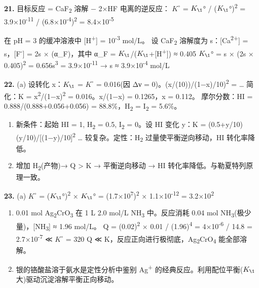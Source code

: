 \textbf{21.} 目标反应 = CaF\textsubscript{2} 溶解 − 2×HF 电离的逆反应：
\(K^{\circ}\) = \(K_{\1}\)° / (\(K_{\1}\)°)\textsuperscript{2} = 3.9×10\textsuperscript{-11} / (6.8×10\textsuperscript{-4})\textsuperscript{2} = 8.4×10\textsuperscript{-5}

在 pH = 3 的缓冲溶液中 {[}H\textsuperscript{+}{]} = 10\textsuperscript{-3} mol/L。
设 CaF\textsubscript{2} 溶解度为 s：{[}Ca\textsuperscript{2+}{]} = s，{[}F\textsuperscript{-}{]} = 2s × (α\_F)，其中 α\_F = \(K_{\1}\)/(\(K_{\1}\)+{[}H\textsuperscript{+}{]}) ≈ 0.405
\(K_{\1}\)° = s × (2s × 0.405)\textsuperscript{2} = 0.656s\textsuperscript{3} = 3.9×10\textsuperscript{-11} → s ≈ 3.9×10\textsuperscript{-4} mol/L

\textbf{22.}
(a) 设转化 x：\(K_{\1}\) = \(K^{\circ}\) = 0.016(因 Δν = 0)。(x/(10))/(1−x)/10)\textsuperscript{2} = \ldots{} 简化：K = x\textsuperscript{2}/(1−x)\textsuperscript{2} = 0.016。x/(1−x) = 0.1265，x = 0.112。
摩尔分数：HI = 0.888/(0.888+0.056+0.056) = 88.8\%，H\textsubscript{2} = I\textsubscript{2} = 5.6\%。

\begin{enumerate}
\def\labelenumi{(\alph{enumi})}
\setcounter{enumi}{1}
\item
  新条件：起始 HI = 1, H\textsubscript{2} = 0.5, I\textsubscript{2} = 0。设 HI 变化 y：K = (0.5+y/10)(y/10)/{[}(1−y)/10{]}\textsuperscript{2} \ldots{} 较复杂。定性：H\textsubscript{2} 过量使平衡逆向移动，HI 转化率降低。
\item
  增加 H\textsubscript{2}(产物)→ Q \textgreater{} K → 平衡逆向移动 → HI 转化率降低。与勒夏特列原理一致。
\end{enumerate}

\textbf{23.}
(a) \(K^{\circ}\) = (\(K_{\1}\)°)\textsuperscript{2} × \(K_{\1}\)° = (1.7×10\textsuperscript{7})\textsuperscript{2} × 1.1×10\textsuperscript{-12} = 3.2×10\textsuperscript{2}

\begin{enumerate}
\def\labelenumi{(\alph{enumi})}
\setcounter{enumi}{1}
\item
  0.01 mol Ag\textsubscript{2}CrO\textsubscript{3} 在 1 L 2.0 mol/L NH\textsubscript{3} 中。反应消耗 0.04 mol NH\textsubscript{3}(极少量)，{[}NH\textsubscript{3}{]} ≈ 1.96 mol/L。
  Q = (0.02)\textsuperscript{2} × 0.01 / (1.96)\textsuperscript{4} = 4×10\textsuperscript{-6} / 14.8 = 2.7×10\textsuperscript{-7} ≪ \(K^{\circ}\) = 320
  Q ≪ K，反应正向进行极彻底，Ag\textsubscript{2}CrO\textsubscript{4} 能全部溶解。
\item
  银的铬酸盐溶于氨水是定性分析中鉴别 Ag\textsuperscript{+} 的经典反应。利用配位平衡(\(K_{\1}\) 大)驱动沉淀溶解平衡正向移动。
\end{enumerate}

